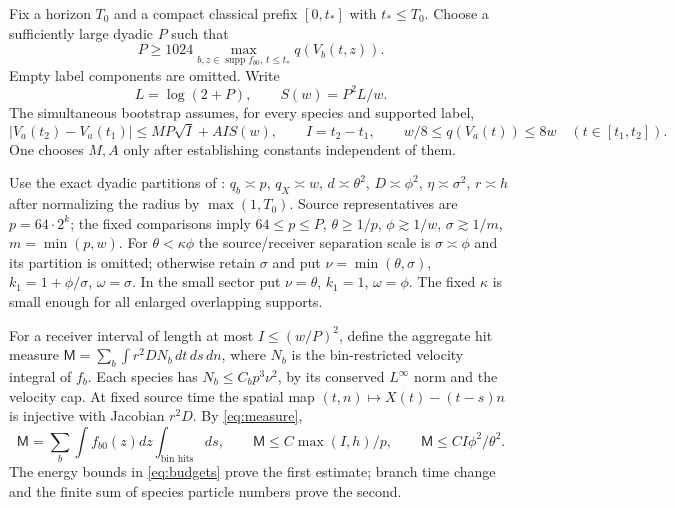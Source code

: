\documentclass[11pt]{article}
\newcommand{\supp}{\operatorname{supp}}
\theoremstyle{remark}\newtheorem{remark}[theorem]{Remark}
\numberwithin{equation}{section}
\begin{document}
Fix a horizon $T_0$ and a compact classical prefix $[0,t_*]$ with
$t_*\le T_0$. Choose a sufficiently large dyadic $P$ such that
\[
 P\ge1024\max_{b,z\in\supp f_{b0},\,t\le t_*}q(V_b(t,z)).
\]
Empty label components are omitted. Write
\[
 L=\log(2+P),\qquad S(w)=P^2L/w.
\]
The simultaneous bootstrap assumes, for every species and supported label,
\begin{equation}\label{eq:bootstrap}
 |V_a(t_2)-V_a(t_1)|\le MP\sqrt I+AI S(w),\qquad I=t_2-t_1,
 \qquad w/8\le q(V_a(t))\le8w\quad(t\in[t_1,t_2]).
\end{equation}
One chooses $M,A$ only after establishing constants independent of them.

Use the exact dyadic partitions of \cite[Section 4]{OAI362}:
$q_b\asymp p$, $q_X\asymp w$, $d\asymp\theta^2$,
$D\asymp\phi^2$, $\eta\asymp\sigma^2$, $r\asymp h$ after normalizing
the radius by $\max(1,T_0)$. Source representatives are $p=64\cdot2^k$;
the fixed comparisons imply $64\le p\le P$, $\theta\ge1/p$,
$\phi\gtrsim1/w$, $\sigma\gtrsim1/m$, $m=\min(p,w)$.
For $\theta<\kappa\phi$ the source/receiver separation scale is
$\sigma\asymp\phi$ and its partition is omitted; otherwise retain
$\sigma$ and put $\nu=\min(\theta,\sigma)$,
$k_1=1+\phi/\sigma$, $\omega=\sigma$.
In the small sector put $\nu=\theta$, $k_1=1$, $\omega=\phi$.
The fixed $\kappa$ is small enough for all enlarged overlapping supports.

For a receiver interval of length at most $I\le(w/P)^2$, define the aggregate
hit measure $\mathsf M=\sum_b\int r^2D N_b\,dt\,ds\,dn$, where
$N_b$ is the bin-restricted velocity integral of $f_b$.
Each species has $N_b\le C_b p^3\nu^2$, by its conserved $L^\infty$ norm
and the velocity cap. At fixed source time the spatial map
$(t,n)\mapsto X(t)-(t-s)n$ is injective with Jacobian $r^2D$.
By \eqref{eq:measure},
\begin{equation}\label{eq:hit}
 \mathsf M=\sum_b\int f_{b0}(z)dz\int_{\text{bin hits}}ds,
 \qquad \mathsf M\le C\max(I,h)/p,
 \qquad\mathsf M\le CI\phi^2/\theta^2.
\end{equation}
The energy bounds in \eqref{eq:budgets} prove the first estimate; branch
time change and the finite sum of species particle numbers prove the second.
\end{document}
